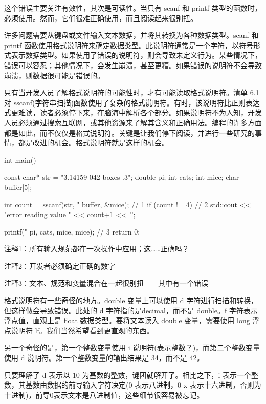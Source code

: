 这个错误主要关注有效性，其次是可读性。当只有 scanf 和 printf 类型的函数时，必须使用。然而，它们很难正确使用，而且阅读起来很别扭。


许多问题需要从键盘或文件输入文本数据，并将其转换为各种数据类型。scanf 和 printf 函数使用格式说明符来确定数据类型。此说明符通常是一个字符，以符号形式表示数据类型。如果使用了错误的说明符，则会导致未定义行为。某些情况下，错误可以容忍；其他情况下，会发生崩溃，甚至更糟。如果错误的说明符不会导致崩溃，则数据很可能是错误的。

只有当开发人员了解格式说明符的可能性时，才有可能读取格式说明符。清单 6.1 对 sscanf(字符串扫描)函数使用了复杂的格式说明符。有时，该说明符比正则表达式更难读，读者必须停下来，在脑海中解析各个部分。如果说明符不为人知，开发人员必须通过搜索互联网，或其他资源来了解其含义和正确用法。编程的许多方面都是如此，而不仅仅是格式说明符。关键是让我们停下阅读，并进行一些研究的事情，都是改进的机会。格式说明符就是这样的机会。


\begin{cpp}
int main() {
  const char* str = "3.14159 042 boxes .3";
  double pi;
  int cats;
  int mice;
  char buffer[5];

  int count = sscanf(str, "%
    buffer, &mice); // 1
  if (count != 4) // 2
    std::cout << "error reading value " << count+1 << '\n';

  printf("%
    pi, cats, mice, mice); // 3
  return 0;
}
\end{cpp}

{\footnotesize
注释1：所有输入规范都在一次操作中应用；这……正确吗？

注释2：开发者必须确定正确的数字

注释3：文本、规范和变量混合在一起很别扭——其中有一个错误
}


格式说明符有一些奇怪的地方。double 变量上可以使用 d 字符进行扫描和转换，但这样做会导致错误。此处的 d 字符指的是decimal，而不是 double。f 字符表示浮点值，直观上是 float 数据类型。要将文本读入 double 变量，需要使用 long 浮点说明符 lf。我们当然希望看到更直观的东西。

另一个奇怪的是，第一个整数变量使用 i 说明符(表示整数？)，而第二个整数变量使用 d 说明符。第一个整数变量的输出结果是 34，而不是 42。

只要理解了 d 表示以 10 为基数的整数，谜团就解开了。相比之下，i 表示一个整数，其基数由数据的前导输入字符决定(0 表示八进制，0 x 表示十六进制，否则为十进制)，前导0表示文本是八进制值，这些细节很容易被忘记。

